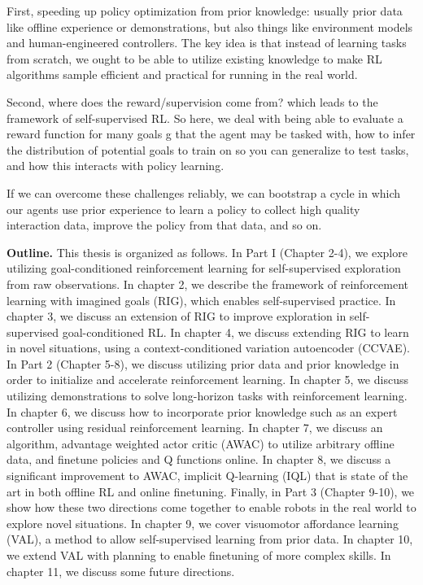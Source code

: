 First, speeding up policy optimization from prior knowledge: usually prior data like offline experience or demonstrations, but also things like environment models and human-engineered controllers. The key idea is that instead of learning tasks from scratch, we ought to be able to utilize existing knowledge to make RL algorithms sample efficient and practical for running in the real world.

Second, where does the reward/supervision come from? which leads to the framework of self-supervised RL. So here, we deal with being able to evaluate a reward function for many goals g that the agent may be tasked with, how to infer the distribution of potential goals to train on so you can generalize to test tasks, and how this interacts with policy learning.

If we can overcome these challenges reliably, we can bootstrap a cycle in which our agents use prior experience to learn a policy to collect high quality interaction data, improve the policy from that data, and so on.

\vspace{5mm}

\textbf{Outline.} This thesis is organized as follows. In Part I (Chapter 2-4), we explore utilizing goal-conditioned reinforcement learning for self-supervised exploration from raw observations. In chapter 2, we describe the framework of reinforcement learning with imagined goals (RIG), which enables self-supervised practice. In chapter 3, we discuss an extension of RIG to improve exploration in self-supervised goal-conditioned RL. In chapter 4, we discuss extending RIG to learn in novel situations, using a context-conditioned variation autoencoder (CCVAE). In Part 2 (Chapter 5-8), we discuss utilizing prior data and prior knowledge in order to initialize and accelerate reinforcement learning. In chapter 5, we discuss utilizing demonstrations to solve long-horizon tasks with reinforcement learning. In chapter 6, we discuss how to incorporate prior knowledge such as an expert controller using residual reinforcement learning. In chapter 7, we discuss an algorithm, advantage weighted actor critic (AWAC) to utilize arbitrary offline data, and finetune policies and Q functions online. In chapter 8, we discuss a significant improvement to AWAC, implicit Q-learning (IQL) that is state of the art in both offline RL and online finetuning. Finally, in Part 3 (Chapter 9-10), we show how these two directions come together to enable robots in the real world to explore novel situations. In chapter 9, we cover visuomotor affordance learning (VAL), a method to allow self-supervised learning from prior data. In chapter 10, we extend VAL with planning to enable finetuning of more complex skills. In chapter 11, we discuss some future directions.



